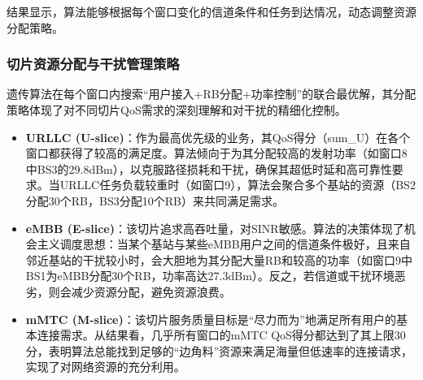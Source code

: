 结果显示，算法能够根据每个窗口变化的信道条件和任务到达情况，动态调整资源分配策略。
\subsubsection{切片资源分配与干扰管理策略}
遗传算法在每个窗口内搜索“用户接入+RB分配+功率控制”的联合最优解，其分配策略体现了对不同切片QoS需求的深刻理解和对干扰的精细化控制。
\begin{itemize}
    \item \textbf{URLLC (U-slice)}：作为最高优先级的业务，其QoS得分（sum\_U）在各个窗口都获得了较高的满足度。算法倾向于为其分配较高的发射功率（如窗口8中BS3的29.8dBm），以克服路径损耗和干扰，确保其超低时延和高可靠性要求。当URLLC任务负载较重时（如窗口9），算法会聚合多个基站的资源（BS2分配30个RB，BS3分配10个RB）来共同满足需求。
    \item \textbf{eMBB (E-slice)}：该切片追求高吞吐量，对SINR敏感。算法的决策体现了机会主义调度思想：当某个基站与某些eMBB用户之间的信道条件极好，且来自邻近基站的干扰较小时，会大胆地为其分配大量RB和较高的功率（如窗口9中BS1为eMBB分配30个RB，功率高达27.3dBm）。反之，若信道或干扰环境恶劣，则会减少资源分配，避免资源浪费。
    \item \textbf{mMTC (M-slice)}：该切片服务质量目标是“尽力而为”地满足所有用户的基本连接需求。从结果看，几乎所有窗口的mMTC QoS得分都达到了其上限30分，表明算法总能找到足够的“边角料”资源来满足海量但低速率的连接请求，实现了对网络资源的充分利用。
\end{itemize}




